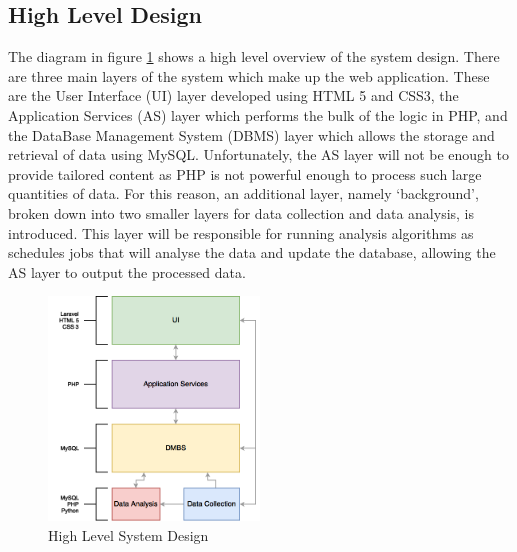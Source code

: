 \subsection{High Level Design}
The diagram in figure \ref{fig:LayerArchitecture} shows a high level overview of the system design. There are three main layers of the system which make up the web application. These are the User Interface (UI) layer developed using HTML 5 and CSS3, the Application Services (AS) layer which performs the bulk of the logic in PHP, and the DataBase Management System (DBMS) layer which allows the storage and retrieval of data using MySQL. Unfortunately, the AS layer will not be enough to provide tailored content as PHP is not powerful enough to process such large quantities of data. For this reason, an additional layer, namely `background', broken down into two smaller layers for data collection and data analysis, is introduced. This layer will be responsible for running analysis algorithms as schedules jobs that will analyse the data and update the database, allowing the AS layer to output the processed data.

\begin{figure}[H]
  \centering
  \includegraphics[width=0.5\textwidth]{Images/Design/LayerArchitecture}
  \caption{High Level System Design} \label{fig:LayerArchitecture} 
\end{figure}

